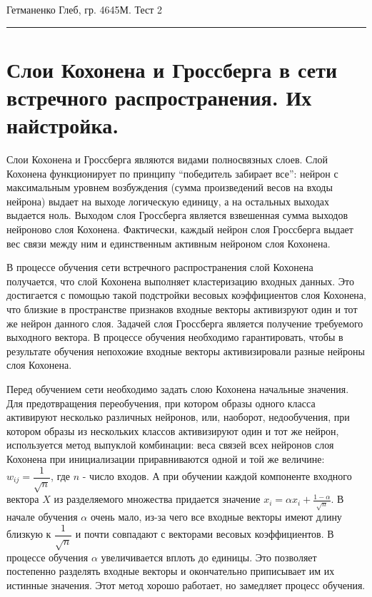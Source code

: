 \documentclass[12pt,a4paper]{article}
\begin{document}
{\raggedleft \Large Гетманенко Глеб, гр. 4645М. Тест 2 \par}

\hrule

\section{Слои Кохонена и Гроссберга в сети встречного распространения. Их найстройка.}

Слои Кохонена и Гроссберга являются видами полносвязных слоев. Слой Кохонена
функционирует по принципу ``победитель забирает все'': нейрон с максимальным уровнем
возбуждения (сумма произведений весов на входы нейрона) выдает на выходе
логическую единицу, а на остальных выходах выдается ноль. Выходом
слоя Гроссберга является взвешенная сумма выходов нейроново слоя Кохонена.
Фактически, каждый нейрон слоя Гроссберга выдает вес связи между ним и единственным
активным нейроном слоя Кохонена.

В процессе обучения сети встречного распространения слой Кохонена получается,
что слой Кохонена выполняет кластеризацию входных данных. Это достигается с помощью
такой подстройки весовых коэффициентов слоя Кохонена, что близкие в пространстве
признаков входные векторы активизруют один и тот же нейрон данного слоя. Задачей
слоя Гроссберга является получение требуемого выходного вектора. В процессе обучения
необходимо гарантировать, чтобы в результате обучения непохожие входные векторы
активизировали разные нейроны слоя Кохонена.

Перед обучением сети необходимо задать слою Кохонена начальные значения.
Для предотвращения переобучения, при котором образы одного класса активируют
несколько различных нейронов, или, наоборот, недообучения, при котором образы
из нескольких классов активизируют один и тот же нейрон, используется метод
выпуклой комбинации: веса связей всех нейронов слоя Кохонена при инициализации
приравниваются одной и той же величине: $ w_{ij} = \dfrac{1}{\sqrt{n}} $,
где $n$ - число входов. А при обучении каждой компоненте входного вектора $X$
из разделяемого множества придается значение
$x_i = \alpha x_i + \frac{1-\alpha}{\sqrt{n}}$. В начале обучения $\alpha$
очень мало, из-за чего все входные векторы имеют длину близкую к $\dfrac{1}{\sqrt{n}}$
и почти совпадают с векторами весовых коэффициентов. В процессе обучения 
$\alpha$ увеличивается вплоть до единицы. Это позволяет постепенно разделять
входные векторы и окончательно приписывает им их истинные значения. Этот
метод хорошо работает, но замедляет процесс обучения.
\end{document}
